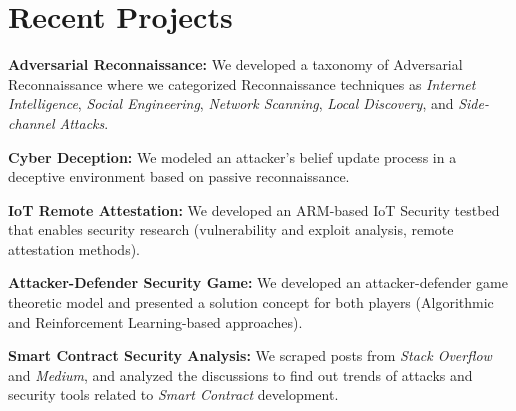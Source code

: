 \documentclass[letterpaper,dvipsnames]{deedy-resume} %
\begin{document}
\begin{minipage}[t]{0.63\textwidth}

\section{Recent Projects}


\begin{tightitemize}
\item \textbf{Adversarial Reconnaissance:} We developed a taxonomy of Adversarial Reconnaissance where we categorized Reconnaissance techniques as \emph{Internet Intelligence}, \emph{Social Engineering}, \emph{Network Scanning}, \emph{Local Discovery}, and \emph{Side-channel Attacks}. 

\item \textbf{Cyber Deception:} We modeled an attacker's belief update process in a deceptive environment based on passive reconnaissance.

\item \textbf{IoT Remote Attestation:} We developed an ARM-based IoT Security testbed that enables security research (vulnerability and exploit analysis, remote attestation methods).

\end{tightitemize}


\sectionspace %


\begin{tightitemize}
\item \textbf{Attacker-Defender Security Game:} We developed an attacker-defender game theoretic model and presented a solution concept for both players (Algorithmic and Reinforcement Learning-based approaches).
\end{tightitemize}

\sectionspace %

\begin{tightitemize}
\item \textbf{Smart Contract Security Analysis:} We scraped posts from \emph{Stack Overflow} and \emph{Medium}, and analyzed the discussions to find out trends of attacks and security tools related to \emph{Smart Contract} development.


\end{tightitemize}
\end{minipage}
\end{document}
